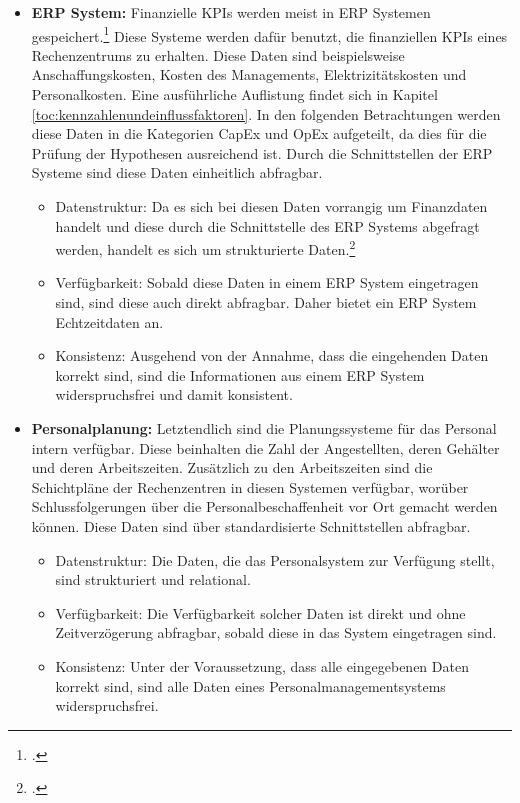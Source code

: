 \begin{itemize}
\begin{itemize}
    \end{itemize}
    \item \textbf{ERP System: }Finanzielle \acp{KPI} werden meist in \ac{ERP} Systemen
    gespeichert.\footcite[Vgl.][Tabelle 3]{spathis2003usefulness} Diese Systeme werden dafür benutzt, die finanziellen \acp{KPI}
    eines Rechenzentrums zu erhalten. Diese Daten sind beispielsweise Anschaffungskosten, Kosten des Managements,
    Elektrizitätskosten und Personalkosten. Eine ausführliche Auflistung findet sich in
    Kapitel \ref{toc:kennzahlenundeinflussfaktoren}. In den folgenden Betrachtungen werden diese Daten in die Kategorien
    \ac{CapEx} und \ac{OpEx} aufgeteilt, da dies für die Prüfung der Hypothesen ausreichend ist. Durch die Schnittstellen
    der ERP Systeme sind diese Daten einheitlich abfragbar.
    \begin{itemize}
        \item Datenstruktur: Da es sich bei diesen Daten vorrangig um Finanzdaten handelt und diese durch die Schnittstelle
        des ERP Systems abgefragt werden, handelt es sich um strukturierte Daten.\footcite[Vgl.][S. 27]{kimble2015big}
        \item Verfügbarkeit: Sobald diese Daten in einem \ac{ERP} System eingetragen sind, sind diese auch direkt abfragbar.
        Daher bietet ein \ac{ERP} System Echtzeitdaten an.
        \item Konsistenz: Ausgehend von der Annahme, dass die eingehenden Daten korrekt sind, sind die Informationen aus
        einem \ac{ERP} System widerspruchsfrei und damit konsistent.
    \end{itemize}
    \item \textbf{Personalplanung: }Letztendlich sind die Planungssysteme für das Personal intern verfügbar. Diese
    beinhalten die Zahl der Angestellten, deren Gehälter und deren Arbeitszeiten. Zusätzlich zu den Arbeitszeiten sind die
    Schichtpläne der Rechenzentren in diesen Systemen verfügbar, worüber Schlussfolgerungen über die Personalbeschaffenheit
    vor Ort gemacht werden können. Diese Daten sind über standardisierte Schnittstellen abfragbar.
    \begin{itemize}
        \item Datenstruktur: Die Daten, die das Personalsystem zur Verfügung stellt, sind strukturiert und relational.
        \item Verfügbarkeit: Die Verfügbarkeit solcher Daten ist direkt und ohne Zeitverzögerung abfragbar, sobald diese in
        das System eingetragen sind.
        \item Konsistenz: Unter der Voraussetzung, dass alle eingegebenen Daten korrekt sind, sind alle Daten eines
        Personalmanagementsystems widerspruchsfrei.
    \end{itemize}
\end{itemize}

